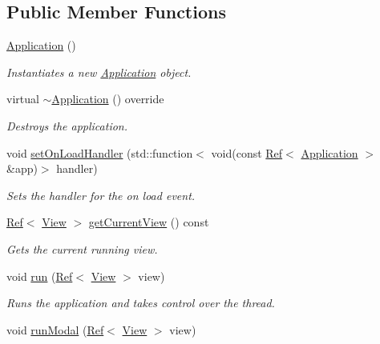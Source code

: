 \subsection*{Public Member Functions}
\begin{DoxyCompactItemize}
\item 
\mbox{\hyperlink{class_application_afa8cc05ce6b6092be5ecdfdae44e05f8}{Application}} ()
\begin{DoxyCompactList}\small\item\em Instantiates a new \mbox{\hyperlink{class_application}{Application}} object. \end{DoxyCompactList}\item 
virtual \mbox{\hyperlink{class_application_af30193b728aeacfd07b56f6a1117182f}{$\sim$\+Application}} () override
\begin{DoxyCompactList}\small\item\em Destroys the application. \end{DoxyCompactList}\item 
void \mbox{\hyperlink{class_application_a17a7ce731c6cae502839fca4bfc726ea}{set\+On\+Load\+Handler}} (std\+::function$<$ void(const \mbox{\hyperlink{class_ref}{Ref}}$<$ \mbox{\hyperlink{class_application}{Application}} $>$ \&app)$>$ handler)
\begin{DoxyCompactList}\small\item\em Sets the handler for the on load event. \end{DoxyCompactList}\item 
\mbox{\hyperlink{class_ref}{Ref}}$<$ \mbox{\hyperlink{class_view}{View}} $>$ \mbox{\hyperlink{class_application_a9099ecb8b2568c89dde070a8b701715a}{get\+Current\+View}} () const
\begin{DoxyCompactList}\small\item\em Gets the current running view. \end{DoxyCompactList}\item 
void \mbox{\hyperlink{class_application_a9ca5a609b230392b1bb06917ac097de6}{run}} (\mbox{\hyperlink{class_ref}{Ref}}$<$ \mbox{\hyperlink{class_view}{View}} $>$ view)
\begin{DoxyCompactList}\small\item\em Runs the application and takes control over the thread. \end{DoxyCompactList}\item 
void \mbox{\hyperlink{class_application_a782adfa17cf6a50b9242c0eb22447206}{run\+Modal}} (\mbox{\hyperlink{class_ref}{Ref}}$<$ \mbox{\hyperlink{class_view}{View}} $>$ view)

\end{DoxyCompactItemize}

